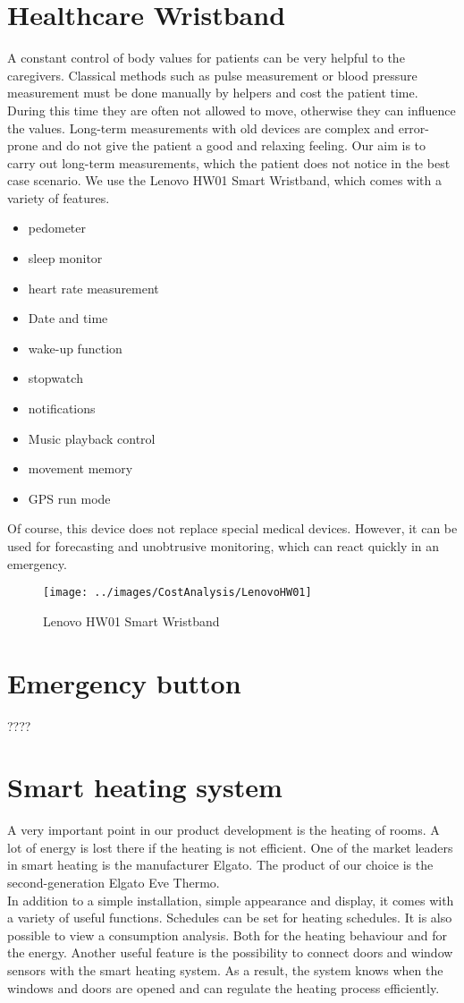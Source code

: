 \section{Healthcare Wristband}
A constant control of body values for patients can be very helpful to the caregivers. Classical methods such as pulse measurement or blood pressure measurement must be done manually by helpers and cost the patient time. During this time they are often not allowed to move, otherwise they can influence the values. Long-term measurements with old devices are complex and error-prone and do not give the patient a good and relaxing feeling. Our aim is to carry out long-term measurements, which the patient does not notice in the best case scenario. We use the Lenovo HW01 Smart Wristband, which comes with a variety of features. 
\begin{itemize}
	\item pedometer
	\item sleep monitor
	\item heart rate measurement
	\item Date and time
	\item wake-up function
	\item stopwatch
	\item notifications
	\item Music playback control
	\item movement memory
	\item GPS run mode
\end{itemize}
Of course, this device does not replace special medical devices. However, it can be used for forecasting and unobtrusive monitoring, which can react quickly in an emergency.

\begin{figure}[h]
	\centering
	\texttt{[image: ../images/CostAnalysis/LenovoHW01]} 
	\caption{Lenovo HW01 Smart Wristband}
	\label{fig:lenovoHealth}
\end{figure}

\section{Emergency button}
????

\section{Smart heating system}
\label{sec:smartHeating}
A very important point in our product development is the heating of rooms. A lot of energy is lost there if the heating is not efficient. One of the market leaders in smart heating is the manufacturer Elgato. The product of our choice is the second-generation Elgato Eve Thermo. 
\\
In addition to a simple installation, simple appearance and display, it comes with a variety of useful functions. Schedules can be set for heating schedules. It is also possible to view a consumption analysis. Both for the heating behaviour and for the energy. Another useful feature is the possibility to connect doors and window sensors with the smart heating system. As a result, the system knows when the windows and doors are opened and can regulate the heating process efficiently.

